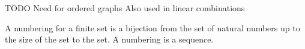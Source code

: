 


TODO
Need for ordered graphs
Also used in linear combinations


A numbering for a finite set is a bijection from the set of natural numbers up to the size of the set to the set.
A numbering is a sequence.

